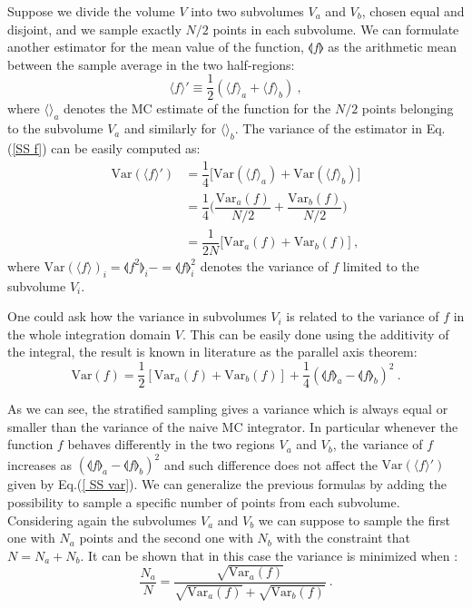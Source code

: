 \documentclass[../main/main.tex]{subfiles}
\begin{document}
Suppose we divide the volume $V$ into two subvolumes $V_a$  and $V_b$, chosen equal and disjoint, and we sample exactly $N/2$ points in each subvolume. We can formulate another estimator for the mean value of the function, $\llangle f \rrangle $ as the arithmetic mean between the sample average
in the two half-regions:
\begin{equation}
	\label {SS f}
	\langle f  \rangle ' \equiv \frac{1}{2} (  \langle f \rangle_a + \langle f \rangle_b ) \ ,
\end{equation}
where $\langle \rangle_a$ denotes the MC estimate of the function for the $N/2$ points belonging to the subvolume $V_a$ and similarly for $\langle \rangle_b$.
The variance of the estimator in Eq.(\ref{SS f}) can be easily computed as:
\begin{eqnarray}
	\text{Var}(\langle f \rangle ') &= \dfrac{1}{4}  \big[  \text{Var}(\langle f \rangle_a) +\text{Var}(\langle f \rangle_b)  \big]  \\
	&= \dfrac{1}{4} \bigg(  \dfrac{\text{Var}_a(f)}{N/2} +\dfrac{\text{Var}_b(f)}{N/2} \bigg) \\
	&= \dfrac{1}{2N} \big[ \text{Var}_a(f) + \text{Var}_b(f)\big] \label{var_stratified} \ ,
	\label{ SS var}
\end{eqnarray}
where $\text{Var}(\langle f \rangle)_{i} = \llangle f^2 \rrangle_i - = \llangle f \rrangle^2_i$ denotes the variance of $f$ limited to the subvolume $V_i$.

One could ask how the variance in subvolumes $V_i$ is related to the variance of $f$ in the whole integration domain $V$. This can be easily done using the additivity of the integral, the result is known in literature as the parallel axis theorem:
\begin{equation}
	\text{Var}(f) = \frac{1}{2} [ \text{Var}_a(f) + \text{Var}_b(f)] + \frac{1}{4} ( 
	\llangle f \rrangle_a - \llangle f \rrangle_b)^2 \ .
\end{equation}

As we can see, the stratified sampling gives a variance which is always equal or smaller than the variance of the naive MC integrator. In particular whenever the function $f$ behaves differently in 
the two regions $V_a$ and $V_b$, the variance of $f$ increases as $ ( 
\llangle f \rrangle_a - \llangle f \rrangle_b)^2$ and such difference does not affect the $\text{Var}(\langle f \rangle')$ given by Eq.(\ref{ SS var}).
\newline
We can generalize the previous formulas by adding the possibility to sample a specific number of 
points from each subvolume. Considering again the subvolumes $V_a$ and $V_b$ we can suppose 
to sample the first one with $N_a$ points and the second one with $N_b$ with the constraint that $N = N_a + N_b$. 
\newline
It can be shown that in this case the variance is minimized when \cite{Press:1989vk}:
\begin{equation}
	\frac{N_a}{N} = \frac{\sqrt{\text{Var}_a(f)}}{\sqrt{\text{Var}_a(f)}+
		\sqrt{\text{Var}_b(f)}} \ .
\end{equation}
\end{document}
